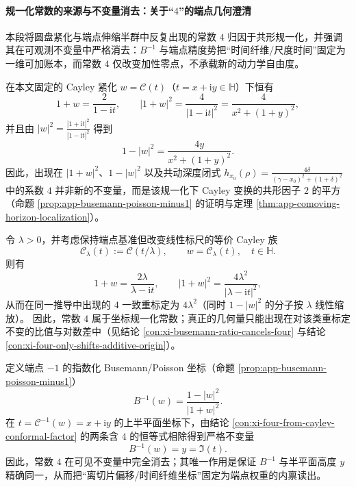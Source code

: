 \paragraph{规一化常数的来源与不变量消去：关于“\texorpdfstring{$4$}{4}”的端点几何澄清}
本段将圆盘紧化与端点伸缩半群中反复出现的常数 \(4\) 归因于共形规一化，并强调其在可观测不变量中严格消去：\(B^{-1}\) 与端点精度势把“时间纤维/尺度时间”固定为一维可加账本，而常数 \(4\) 仅改变加性零点，不承载新的动力学自由度。

\begin{proposition}\label{con:xi-four-from-cayley-conformal-factor}
在本文固定的 Cayley 紧化 \(w=\mathcal{C}(t)\)（\(t=x+\mathrm{i}y\in\mathbb{H}\)）下恒有
\[
1+w=\frac{2}{1-\mathrm{i}t},
\qquad
|1+w|^{2}=\frac{4}{|1-\mathrm{i}t|^{2}}=\frac{4}{x^{2}+(1+y)^{2}},
\]
并且由
\(
|w|^{2}=\frac{|1+\mathrm{i}t|^{2}}{|1-\mathrm{i}t|^{2}}
\)
得到
\[
1-|w|^{2}
=\frac{4y}{x^{2}+(1+y)^{2}}.
\]
因此，出现在 \(|1+w|^{2}\)、\(1-|w|^{2}\) 以及共动深度闭式
\(
h_{x_{0}}(\rho)=\frac{4\delta}{(\gamma-x_{0})^{2}+(1+\delta)^{2}}
\)
中的系数 \(4\) 并非新的不变量，而是该规一化下 Cayley 变换的共形因子 \(2\) 的平方（命题 \ref{prop:app-busemann-poisson-minus1} 的证明与定理 \ref{thm:app-comoving-horizon-localization}）。
\end{proposition}

\begin{proposition}\label{con:xi-four-rescales-under-cayley-gauge}
令 \(\lambda>0\)，并考虑保持端点基准但改变线性标尺的等价 Cayley 族
\[
\mathcal{C}_{\lambda}(t):=\mathcal{C}(t/\lambda),
\qquad
w=\mathcal{C}_{\lambda}(t),\quad t\in\mathbb{H}.
\]
则有
\[
1+w=\frac{2\lambda}{\lambda-\mathrm{i}t},
\qquad
|1+w|^{2}=\frac{4\lambda^{2}}{|\lambda-\mathrm{i}t|^{2}},
\]
从而在同一推导中出现的 \(4\) 一致重标定为 \(4\lambda^{2}\)（同时 \(1-|w|^{2}\) 的分子按 \(\lambda\) 线性缩放）。
因此，常数 \(4\) 属于坐标规一化常数；真正的几何量只能出现在对该类重标定不变的比值与对数差中（见结论 \ref{con:xi-busemann-ratio-cancels-four} 与结论 \ref{con:xi-four-only-shifts-additive-origin}）。
\end{proposition}

\begin{proposition}\label{con:xi-busemann-ratio-cancels-four}
定义端点 \(-1\) 的指数化 Busemann/Poisson 坐标（命题 \ref{prop:app-busemann-poisson-minus1}）
\[
B^{-1}(w)=\frac{1-|w|^{2}}{|1+w|^{2}}.
\]
在 \(t=\mathcal{C}^{-1}(w)=x+\mathrm{i}y\) 的上半平面坐标下，由结论 \ref{con:xi-four-from-cayley-conformal-factor} 的两条含 \(4\) 的恒等式相除得到严格不变量
\[
\boxed{\;B^{-1}(w)=y=\Im(t).\;}
\]
因此，常数 \(4\) 在可见不变量中完全消去；其唯一作用是保证 \(B^{-1}\) 与半平面高度 \(y\) 精确同一，从而把“离切片偏移/时间纤维坐标”固定为端点权重的内禀读出。
\end{proposition}

